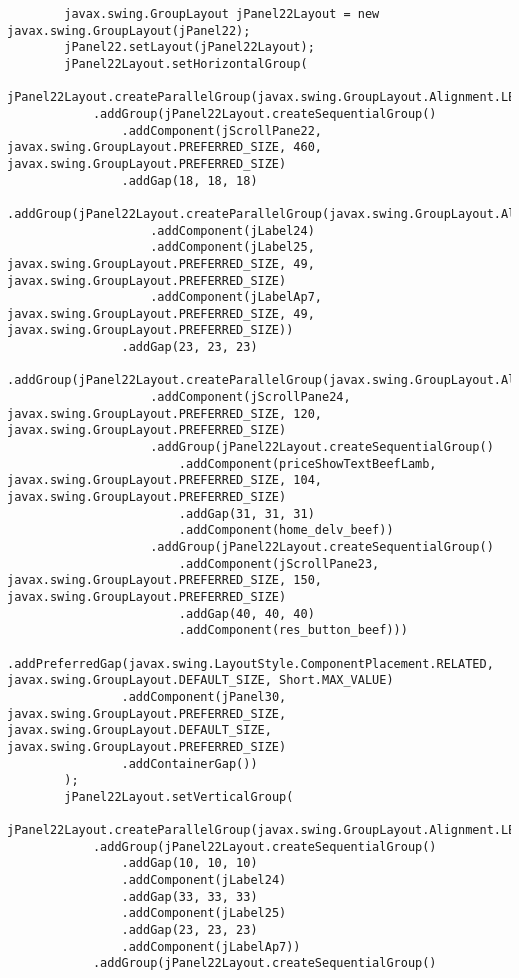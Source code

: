 \documentclass[12pt,a4paper]{article}
\begin{document}
\begin{lstlisting}
        javax.swing.GroupLayout jPanel22Layout = new javax.swing.GroupLayout(jPanel22);
        jPanel22.setLayout(jPanel22Layout);
        jPanel22Layout.setHorizontalGroup(
            jPanel22Layout.createParallelGroup(javax.swing.GroupLayout.Alignment.LEADING)
            .addGroup(jPanel22Layout.createSequentialGroup()
                .addComponent(jScrollPane22, javax.swing.GroupLayout.PREFERRED_SIZE, 460, javax.swing.GroupLayout.PREFERRED_SIZE)
                .addGap(18, 18, 18)
                .addGroup(jPanel22Layout.createParallelGroup(javax.swing.GroupLayout.Alignment.LEADING)
                    .addComponent(jLabel24)
                    .addComponent(jLabel25, javax.swing.GroupLayout.PREFERRED_SIZE, 49, javax.swing.GroupLayout.PREFERRED_SIZE)
                    .addComponent(jLabelAp7, javax.swing.GroupLayout.PREFERRED_SIZE, 49, javax.swing.GroupLayout.PREFERRED_SIZE))
                .addGap(23, 23, 23)
                .addGroup(jPanel22Layout.createParallelGroup(javax.swing.GroupLayout.Alignment.LEADING)
                    .addComponent(jScrollPane24, javax.swing.GroupLayout.PREFERRED_SIZE, 120, javax.swing.GroupLayout.PREFERRED_SIZE)
                    .addGroup(jPanel22Layout.createSequentialGroup()
                        .addComponent(priceShowTextBeefLamb, javax.swing.GroupLayout.PREFERRED_SIZE, 104, javax.swing.GroupLayout.PREFERRED_SIZE)
                        .addGap(31, 31, 31)
                        .addComponent(home_delv_beef))
                    .addGroup(jPanel22Layout.createSequentialGroup()
                        .addComponent(jScrollPane23, javax.swing.GroupLayout.PREFERRED_SIZE, 150, javax.swing.GroupLayout.PREFERRED_SIZE)
                        .addGap(40, 40, 40)
                        .addComponent(res_button_beef)))
                .addPreferredGap(javax.swing.LayoutStyle.ComponentPlacement.RELATED, javax.swing.GroupLayout.DEFAULT_SIZE, Short.MAX_VALUE)
                .addComponent(jPanel30, javax.swing.GroupLayout.PREFERRED_SIZE, javax.swing.GroupLayout.DEFAULT_SIZE, javax.swing.GroupLayout.PREFERRED_SIZE)
                .addContainerGap())
        );
        jPanel22Layout.setVerticalGroup(
            jPanel22Layout.createParallelGroup(javax.swing.GroupLayout.Alignment.LEADING)
            .addGroup(jPanel22Layout.createSequentialGroup()
                .addGap(10, 10, 10)
                .addComponent(jLabel24)
                .addGap(33, 33, 33)
                .addComponent(jLabel25)
                .addGap(23, 23, 23)
                .addComponent(jLabelAp7))
            .addGroup(jPanel22Layout.createSequentialGroup()

\end{lstlisting}
\end{document}
